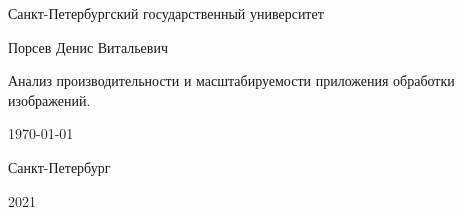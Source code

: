 \begin{titlepage}
\begin{center}
Санкт-Петербургский
государственный университет \\[3mm]

\vspace{65mm}

\begin{large} 
Порсев Денис Витальевич \\[3mm]
\end{large}

\vspace{3mm}

\begin{Large}
Анализ производительности и масштабируемости приложения обработки изображений.
\end{Large} 

\vspace{3mm}

\begin{large}
\today
\end{large}

\vfill 

{Санкт-Петербург}
\par{2021}
\end{center}
\end{titlepage}
\restoregeometry
\addtocounter{page}{1}